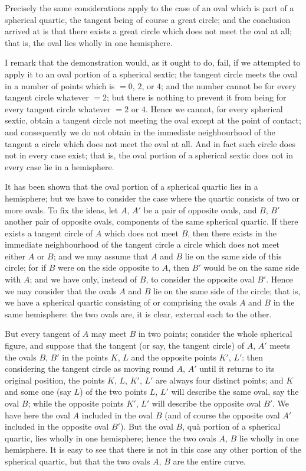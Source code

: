 \documentclass[11pt,a4paper]{article}
\theoremstyle{plain}
\begin{document}
Precisely the same considerations apply to the case of an oval which is part of a spherical quartic, the tangent being of course a great circle; and the conclusion arrived at is that there exists a great circle which does not meet the oval at all; that is, the oval lies wholly in one hemisphere.

I remark that the demonstration would, as it ought to do, fail, if we attempted to apply it to an oval portion of a spherical sextic; the tangent circle meets the oval in a number of points which is $= 0$, $2$, or $4$; and the number cannot be for every tangent circle whatever $= 2$; but there is nothing to prevent it from being for every tangent circle whatever $= 2$ or $4$. Hence we cannot, for every spherical sextic, obtain a tangent circle not meeting the oval except at the point of contact; and consequently we do not obtain in the immediate neighbourhood of the tangent a circle which does not meet the oval at all. And in fact such circle does not in every case exist; that is, the oval portion of a spherical sextic does not in every case lie in a hemisphere.

It has been shown that the oval portion of a spherical quartic lies in a hemisphere; but we have to consider the case where the quartic consists of two or more ovals. To fix the ideas, let $A$, $A'$ be a pair of opposite ovals, and $B$, $B'$ another pair of opposite ovals, components of the same spherical quartic. If there exists a tangent circle of $A$ which does not meet $B$, then there exists in the immediate neighbourhood of the tangent circle a circle which does not meet either $A$ or $B$; and we may assume that $A$ and $B$ lie on the same side of this circle; for if $B$ were on the side opposite to $A$, then $B'$ would be on the same side with $A$; and we have only, instead of $B$, to consider the opposite oval $B'$. Hence we may consider that the ovals $A$ and $B$ lie on the same side of the circle; that is, we have a spherical quartic consisting of or comprising the ovals $A$ and $B$ in the same hemisphere: the two ovals are, it is clear, external each to the other.

But every tangent of $A$ may meet $B$ in two points; consider the whole spherical figure, and suppose that the tangent (or say, the tangent circle) of $A$, $A'$ meets the ovals $B$, $B'$ in the points $K$, $L$ and the opposite points $K'$, $L'$: then considering the tangent circle as moving round $A$, $A'$ until it returns to its original position, the points $K$, $L$, $K'$, $L'$ are always four distinct points; and $K$ and some one (say $L$) of the two points $L$, $L'$ will describe the same oval, say the oval $B$; while the opposite points $K'$, $L'$ will describe the opposite oval $B'$. We have here the oval $A$ included in the oval $B$ (and of course the opposite oval $A'$ included in the opposite oval $B'$). But the oval $B$, qu\`{a} portion of a spherical quartic, lies wholly in one hemisphere; hence the two ovals $A$, $B$ lie wholly in one hemisphere. It is easy to see that there is not in this case any other portion of the spherical quartic, but that the two ovals $A$, $B$ are the entire curve.
\end{document}
